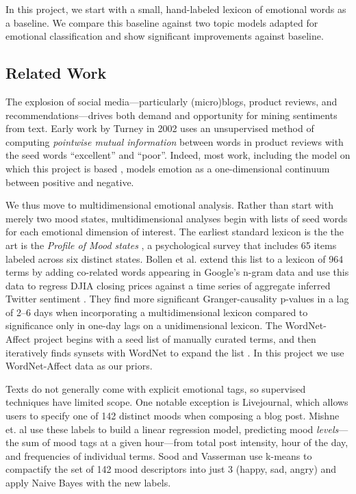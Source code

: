 \documentclass{article}
\begin{document}
In this project, we start with a small, hand-labeled lexicon of
emotional words as a baseline. We compare this baseline against two
topic models adapted for emotional classification and show significant
improvements against baseline.

\subsection{Related Work}
The explosion of social media---particularly (micro)blogs, product
reviews, and recommendations---drives both demand and opportunity
for mining sentiments from text. Early work by Turney in 2002
\citep{turney02} uses an unsupervised method of computing \emph{pointwise
mutual information} between words in product reviews with the seed
words ``excellent'' and ``poor''. Indeed, most work, including the
model on which this project is based \citep{lin03}, models emotion
as a one-dimensional continuum between positive and negative.

We thus move to multidimensional emotional analysis. Rather than
start with merely two mood states, multidimensional analyses begin
with lists of seed words for each emotional dimension of interest.
The earliest standard lexicon is the the art is the \emph{Profile
of Mood states} \citep{mcnair71}, a psychological survey that
includes 65 items labeled across six distinct states. Bollen et
al. extend this list to a lexicon of 964 terms by adding co-related
words appearing in Google's n-gram data and use this data to regress
DJIA closing prices against a time series of aggregate inferred
Twitter sentiment \citep{bollen11}. They find more significant
Granger-causality p-values in a lag of 2--6 days when incorporating
a multidimensional lexicon compared to significance only in one-day
lags on a unidimensional lexicon. The WordNet-Affect project begins
with a seed list of manually curated terms, and then iteratively
finds synsets with WordNet to expand the list \citep{strapparava04}.
In this project we use WordNet-Affect data as our priors.

Texts do not generally come with explicit emotional tags, so
supervised techniques have limited scope. One notable exception is
Livejournal, which allows users to specify one of 142 distinct moods
when composing a blog post. Mishne et. al \citep{mishne06} use these
labels to build a linear regression model, predicting mood
\emph{levels}---the sum of mood tags at a given hour---from total
post intensity, hour of the day, and frequencies of individual
terms. Sood and Vasserman use k-means to compactify the set of 142
mood descriptors into just 3 (happy, sad, angry) and apply Naive Bayes
with the new labels.
\end{document}
